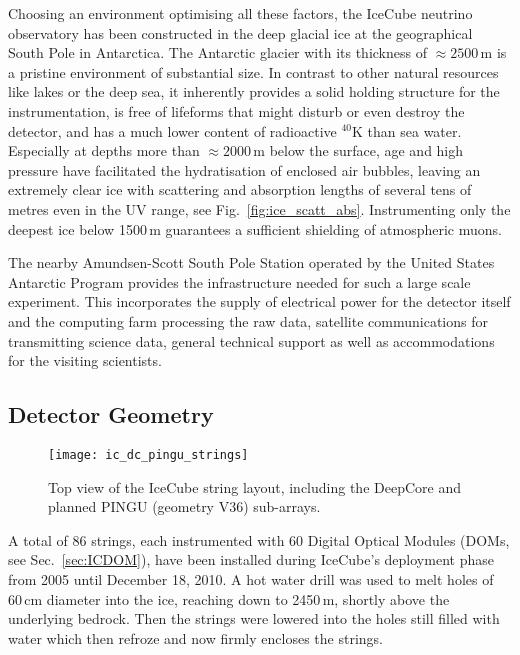 \noindent
Choosing an environment optimising all these factors, the IceCube neutrino 
observatory has been constructed in the deep glacial ice at the geographical 
South Pole in Antarctica. The Antarctic glacier with its thickness of $\approx 
2500$\,m is a pristine environment of substantial size. In contrast to other
natural 
resources like lakes or the deep sea, it inherently provides a solid holding 
structure for the instrumentation, is free of lifeforms that might disturb or 
even destroy the detector, and has a much lower content of radioactive $^{40}$K 
than sea water. Especially at depths more than $\approx 2000$\,m below the 
surface, age and high pressure have facilitated the hydratisation of enclosed 
air bubbles, leaving an extremely clear ice with scattering and absorption 
lengths of several tens of metres even in the UV range, see 
Fig.~\ref{fig:ice_scatt_abs}. Instrumenting only the deepest ice below 1500\,m 
guarantees a sufficient shielding of atmospheric muons. 

The nearby Amundsen-Scott South Pole Station operated by the United States 
Antarctic Program provides the infrastructure needed for such a large scale 
experiment. This incorporates the supply of electrical power for the detector 
itself and the computing farm processing the raw data, satellite communications 
for transmitting science data, general technical support as well as 
accommodations for the visiting scientists.

\subsection{Detector Geometry}
\label{sec:ICgeometry}

\begin{figure}[thp]
 \centering
 \texttt{[image: ic\_dc\_pingu\_strings]}
 \caption{Top view of the IceCube string layout, including the DeepCore and
planned PINGU (geometry V36) sub-arrays.}
 \label{fig:string_layout}
\end{figure}

A total of 86 strings, each instrumented with 60 Digital Optical Modules (DOMs, 
see Sec.~\ref{sec:ICDOM}), have been installed during IceCube's deployment phase 
from 2005 until December 18, 2010. A hot water drill was used to melt holes of 
60\,cm diameter into the ice, reaching down to 2450\,m, shortly above the 
underlying bedrock. Then the strings were lowered into the holes still filled 
with water which then refroze and now firmly encloses the strings.

